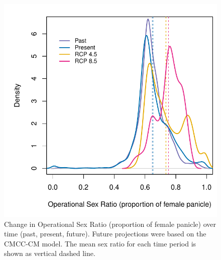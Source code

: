 \documentclass[12pt]{article}\usepackage[]{graphicx}\usepackage[dvipsnames]{xcolor}
\begin{document}
\begin{figure}[H]
	\begin{center}
		\includegraphics[width=0.8\linewidth]{Figures/POAR_OSR.pdf}
		\caption{Change in Operational Sex Ratio (proportion of female panicle) over time (past, present, future).
			Future projections were based on the CMCC-CM model.
			The mean sex ratio for each time period is shown as vertical dashed line.}
		\label{fig:srprojcmc}
	\end{center}
\end{figure}
\end{document}
